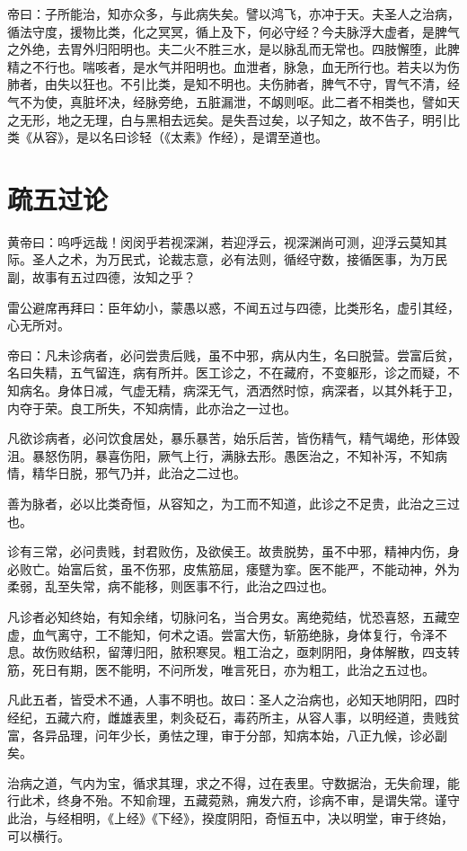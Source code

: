 \documentclass{article}%
\begin{document}
帝曰：子所能治，知亦众多，与此病失矣。譬以鸿飞，亦冲于天。夫圣人之治病，循法守度，援物比类，化之冥冥，循上及下，何必守经？今夫脉浮大虚者，是脾气之外绝，去胃外归阳明也。夫二火不胜三水，是以脉乱而无常也。四肢懈堕，此脾精之不行也。喘咳者，是水气并阳明也。血泄者，脉急，血无所行也。若夫以为伤肺者，由失以狂也。不引比类，是知不明也。夫伤肺者，脾气不守，胃气不清，经气不为使，真脏坏决，经脉旁绝，五脏漏泄，不衂则呕。此二者不相类也，譬如天之无形，地之无理，白与黑相去远矣。是失吾过矣，以子知之，故不告子，明引比类《从容》，是以名曰诊轻（《太素》作经），是谓至道也。
\section{疏五过论}
黄帝曰：呜呼远哉！闵闵乎若视深渊，若迎浮云，视深渊尚可测，迎浮云莫知其际。圣人之术，为万民式，论裁志意，必有法则，循经守数，接循医事，为万民副，故事有五过四德，汝知之乎？

雷公避席再拜曰：臣年幼小，蒙愚以惑，不闻五过与四德，比类形名，虚引其经，心无所对。

帝曰：凡未诊病者，必问尝贵后贱，虽不中邪，病从内生，名曰脱营。尝富后贫，名曰失精，五气留连，病有所并。医工诊之，不在藏府，不变躯形，诊之而疑，不知病名。身体日减，气虚无精，病深无气，洒洒然时惊，病深者，以其外耗于卫，内夺于荣。良工所失，不知病情，此亦治之一过也。

凡欲诊病者，必问饮食居处，暴乐暴苦，始乐后苦，皆伤精气，精气竭绝，形体毁沮。暴怒伤阴，暴喜伤阳，厥气上行，满脉去形。愚医治之，不知补泻，不知病情，精华日脱，邪气乃并，此治之二过也。

善为脉者，必以比类奇恒，从容知之，为工而不知道，此诊之不足贵，此治之三过也。

诊有三常，必问贵贱，封君败伤，及欲侯王。故贵脱势，虽不中邪，精神内伤，身必败亡。始富后贫，虽不伤邪，皮焦筋屈，痿躄为挛。医不能严，不能动神，外为柔弱，乱至失常，病不能移，则医事不行，此治之四过也。

凡诊者必知终始，有知余绪，切脉问名，当合男女。离绝菀结，忧恐喜怒，五藏空虚，血气离守，工不能知，何术之语。尝富大伤，斩筋绝脉，身体复行，令泽不息。故伤败结积，留薄归阳，脓积寒炅。粗工治之，亟刺阴阳，身体解散，四支转筋，死日有期，医不能明，不问所发，唯言死日，亦为粗工，此治之五过也。

凡此五者，皆受术不通，人事不明也。故曰：圣人之治病也，必知天地阴阳，四时经纪，五藏六府，雌雄表里，刺灸砭石，毒药所主，从容人事，以明经道，贵贱贫富，各异品理，问年少长，勇怯之理，审于分部，知病本始，八正九候，诊必副矣。

治病之道，气内为宝，循求其理，求之不得，过在表里。守数据治，无失俞理，能行此术，终身不殆。不知俞理，五藏菀熟，痈发六府，诊病不审，是谓失常。谨守此治，与经相明，《上经》《下经》，揆度阴阳，奇恒五中，决以明堂，审于终始，可以横行。
\end{document}
